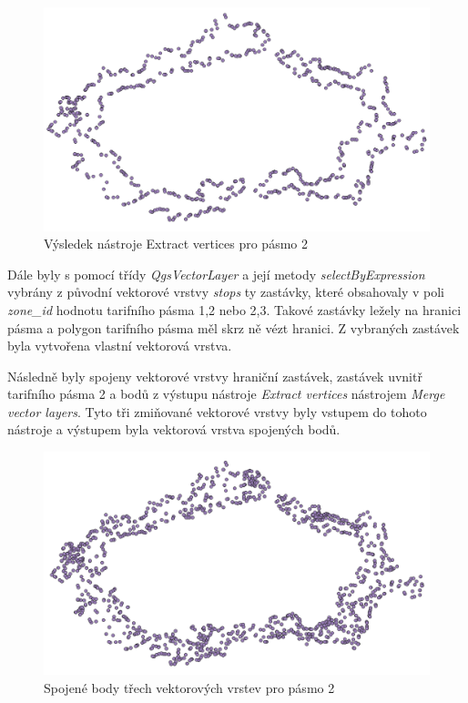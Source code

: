 \begin{figure}[H] \centering
    \includegraphics[width=400pt]{./pictures/vertices.png}
    \caption[Výsledek nástroje Extract vertices pro pásmo 2]{Výsledek nástroje Extract vertices pro pásmo 2}
	\label{fig:vertices}              
\end{figure} 

Dále byly s pomocí třídy \textit{QgsVectorLayer} a její metody \textit{selectByExpression} vybrány 
z původní vektorové vrstvy \textit{stops} ty zastávky, které obsahovaly v poli \textit{zone\_id}
hodnotu tarifního pásma 1,2 nebo 2,3. Takové zastávky ležely na hranici pásma a polygon tarifního pásma
měl skrz ně vézt hranici. Z vybraných zastávek byla vytvořena vlastní vektorová vrstva. 

Následně byly spojeny vektorové vrstvy hraniční zastávek, zastávek uvnitř tarifního pásma 2 a
bodů z výstupu nástroje \textit{Extract vertices} nástrojem \textit{Merge vector layers}.
Tyto tři zmiňované vektorové vrstvy byly vstupem do tohoto nástroje a výstupem byla 
vektorová vrstva spojených bodů. 

\begin{figure}[H] \centering
    \includegraphics[width=400pt]{./pictures/merged.png}
    \caption[Spojené body třech vektorových vrstev pro pásmo 2]{Spojené body třech vektorových vrstev pro pásmo 2}
	\label{fig:merged}              
\end{figure} 

